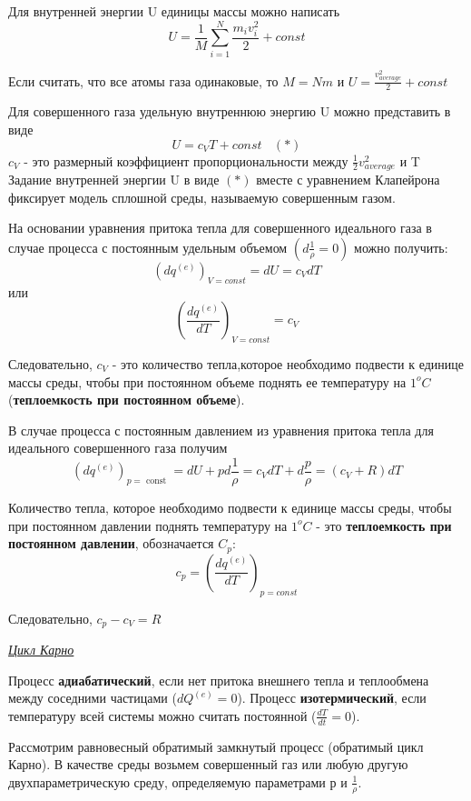 Для внутренней энергии U единицы массы можно написать
$$ U = \frac{1}{M}\sum\limits_{i=1}^{N}\frac{m_iv_i^2}{2} + const $$

Если считать, что все атомы газа одинаковые, то $M = Nm$ и 
$\displaystyle U = \frac{v_{average}^2}{2} + const $

Для совершенного газа удельную внутреннюю энергию U можно представить в виде
$$ U = c_VT + const \ \ \ \ (*)$$
$c_V$ - это размерный коэффициент пропорциональности между $\frac{1}{2}v_{average}^2$ и T
Задание внутренней энергии U в виде $(*)$ вместе с уравнением Клапейрона фиксирует модель сплошной среды, называемую совершенным газом. 

На основании уравнения притока тепла для совершенного идеального газа в случае процесса с постоянным удельным объемом $\left(\displaystyle d\frac{1}{\rho}=0\right)$ можно получить:
$$ (dq^{(e)})_{V = const} = dU = c_VdT $$
или
$$ \left( \frac{dq^{(e)}}{dT} \right)_{V=const} = c_V $$

Следовательно,  $c_V$ - это количество тепла,которое необходимо подвести к единице массы среды, чтобы при постоянном объеме поднять ее температуру на $1^oC$ (\textbf{теплоемкость при постоянном объеме}).

В случае процесса с постоянным давлением из уравнения притока тепла для идеального совершенного газа получим
$$ \left(d q^{(e)}\right)_{p=\text { const }}=d U+p d \frac{1}{\rho}=c_V d T+d \frac{p}{\rho}=\left(c_V+R\right) d T $$

Количество тепла, которое необходимо подвести к единице массы среды, чтобы при постоянном давлении поднять температуру на $1^oC$ - это \textbf{теплоемкость при постоянном давлении}, обозначается $C_p$:
$$ c_p = \left( \frac{dq^{(e)}}{dT} \right)_{p=const} $$

Следовательно, $\displaystyle c_p - c_V = R $


\begin{center}
	\textit{\underline{Цикл Карно}}
\end{center}

Процесс \textbf{адиабатический}, если нет притока внешнего тепла и теплообмена между соседними частицами ($\displaystyle dQ^{(e)} = 0$).
Процесс \textbf{изотермический}, если температуру всей системы можно считать постоянной ($\displaystyle \frac{dT}{dt} = 0$).

Рассмотрим равновесный обратимый замкнутый процесс (обратимый цикл Карно). В качестве среды возьмем совершенный газ или любую другую двухпараметрическую среду, определяемую параметрами р и $\frac{1}{\rho}$. 

